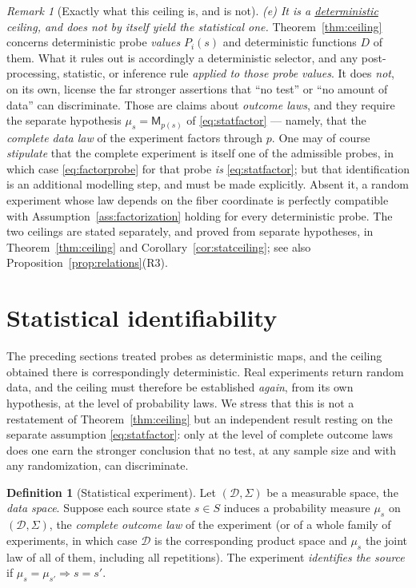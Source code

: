 \documentclass[11pt,reqno]{amsart}
\theoremstyle{plain}
\theoremstyle{definition}
\newtheorem{definition}[theorem]{Definition}
\theoremstyle{remark}
\newtheorem{remark}[theorem]{Remark}
\begin{document}
\begin{remark}[Exactly what this ceiling is, and is not]
\emph{(e) It is a \underline{deterministic} ceiling, and does not by itself yield the statistical one.} Theorem~\ref{thm:ceiling} concerns deterministic probe \emph{values} $P_i(s)$ and deterministic functions $D$ of them. What it rules out is accordingly a deterministic selector, and any post-processing, statistic, or inference rule \emph{applied to those probe values}. It does \emph{not}, on its own, license the far stronger assertions that ``no test'' or ``no amount of data'' can discriminate. Those are claims about \emph{outcome laws}, and they require the separate hypothesis $\mu_s=\mathsf M_{p(s)}$ of \eqref{eq:statfactor} --- namely, that the \emph{complete data law} of the experiment factors through $p$. One may of course \emph{stipulate} that the complete experiment is itself one of the admissible probes, in which case \eqref{eq:factorprobe} for that probe \emph{is} \eqref{eq:statfactor}; but that identification is an additional modelling step, and must be made explicitly. Absent it, a random experiment whose law depends on the fiber coordinate is perfectly compatible with Assumption~\ref{ass:factorization} holding for every deterministic probe. The two ceilings are stated separately, and proved from separate hypotheses, in Theorem~\ref{thm:ceiling} and Corollary~\ref{cor:statceiling}; see also Proposition~\ref{prop:relations}(R3).
\end{remark}

\section{Statistical identifiability}\label{sec:statistical}

The preceding sections treated probes as deterministic maps, and the ceiling obtained there is correspondingly deterministic. Real experiments return random data, and the ceiling must therefore be established \emph{again}, from its own hypothesis, at the level of probability laws. We stress that this is not a restatement of Theorem~\ref{thm:ceiling} but an independent result resting on the separate assumption \eqref{eq:statfactor}: only at the level of complete outcome laws does one earn the stronger conclusion that no test, at any sample size and with any randomization, can discriminate.

\begin{definition}[Statistical experiment]\label{def:experiment}
Let $(\mathcal D,\Sigma)$ be a measurable space, the \emph{data space}. Suppose each source state $s\in S$ induces a probability measure $\mu_s$ on $(\mathcal D,\Sigma)$, the \emph{complete outcome law} of the experiment (or of a whole family of experiments, in which case $\mathcal D$ is the corresponding product space and $\mu_s$ the joint law of all of them, including all repetitions). The experiment \emph{identifies the source} if $\mu_s=\mu_{s'}\Rightarrow s=s'$.
\end{definition}
\end{document}
